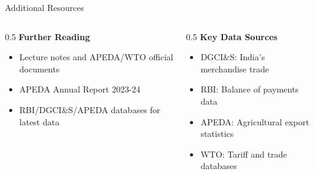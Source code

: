 \documentclass[
  ignorenonframetext,
  aspectratio=169,
]{beamer}
\makeatletter
\providecommand{\tightlist}{%
  \setlength{\itemsep}{0pt}\setlength{\parskip}{0pt}}
\let\quarto@originallabel\label
\DeclareRobustCommand*{\label}[1]{\quarto@originallabel{#1}}
\makeatother
\begin{document}
\begin{frame}{Additional Resources}
\label{additional-resources}
\begin{columns}[T]
\begin{column}{0.5\linewidth}
\textbf{Further Reading}

\begin{itemize}
\tightlist
\item
  Lecture notes and APEDA/WTO official documents
\item
  APEDA Annual Report 2023-24
\item
  RBI/DGCI\&S/APEDA databases for latest data
\end{itemize}
\end{column}

\begin{column}{0.5\linewidth}
\textbf{Key Data Sources}

\begin{itemize}
\tightlist
\item
  DGCI\&S: India's merchandise trade
\item
  RBI: Balance of payments data\\
\item
  APEDA: Agricultural export statistics
\item
  WTO: Tariff and trade databases
\end{itemize}
\end{column}
\end{columns}
\end{frame}
\end{document}
